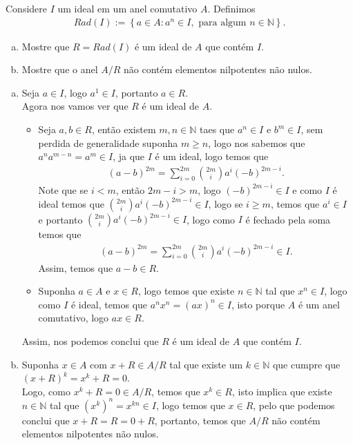 \begin{homeworkProblem}[7]
  Considere $I$ um ideal em um anel comutativo $A$. Definimos
  \begin{align*}
    Rad(I):=\left\{ a\in A:a^{n}\in I,\text{ para algum }n\in\mathbb{N}\right\}.
  \end{align*}
  \begin{enumerate}[a)]
    \item Mostre que $R=Rad(I)$ é um ideal de $A$ que contém $I$.
    \item Mostre que o anel $A/R$ não contém elementos nilpotentes não nulos. 
  \end{enumerate}
  \begin{solution}
  \begin{enumerate}[a)]
    \item Seja $a\in I$, logo $a^{1}\in I$, portanto $a\in R$.\\
      Agora nos vamos ver que $R$ é um ideal de $A$.
      \begin{itemize}
        \item Seja $a,b\in R$, então existem $m,n\in\mathbb{N}$ taes que $a^{n}\in I$ e $b^{m}\in I$, sem perdida de generalidade suponha $m\geq n$, logo nos sabemos que $a^{n}a^{m-n}=a^m\in I$, ja que $I$ é um ideal, logo temos que
        \begin{align*}
          (a-b)^{2m}=\sum_{i=0}^{2m}\binom{2m}{i}a^{i}(-b)^{2m-i}.
        \end{align*}
        Note que se $i<m$, então $2m-i>m$, logo $(-b)^{2m-i}\in I$ e como $I$ é ideal temos que $\binom{2m}{i}a^{i}(-b)^{2m-i}\in I$, logo se $i\geq m$, temos que $a^{i}\in I$ e portanto $\binom{2m}{i}a^{i}(-b)^{2m-i}\in I$, logo como $I$ é fechado pela soma temos que
        \begin{align*} 
          (a-b)^{2m}=\sum_{i=0}^{2m}\binom{2m}{i}a^{i}(-b)^{2m-i}\in I.
        \end{align*}
        Assim, temos que $a-b\in R$.
        \item Suponha $a\in A$ e $x\in R$, logo temos que existe $n\in\mathbb{N}$ tal que $x^{n}\in I$, logo como $I$ é ideal, temos que $a^{n}x^{n}=(ax)^{n}\in I$, isto porque $A$ é um anel comutativo, logo $ax\in R$. 
      \end{itemize}
      Assim, nos podemos conclui que $R$ é um ideal de $A$ que contém $I$.
    \item Suponha $x\in A$ com $x+R\in A/R$ tal que existe um $k\in\mathbb{N}$ que cumpre que $(x+R)^{k}=x^{k}+R=0$.\\
      Logo, como $x^{k}+R=0\in A/R$, temos que $x^{k}\in R$, isto implica que existe $n\in \mathbb{N}$ tal que $(x^{k})^{n}=x^{kn}\in I$, logo temos que $x\in R$, pelo que podemos conclui que $x+R=R=0+R$, portanto, temos que $A/R$ não contém elementos nilpotentes não nulos.  
  \end{enumerate}  
  \end{solution}
\end{homeworkProblem}
